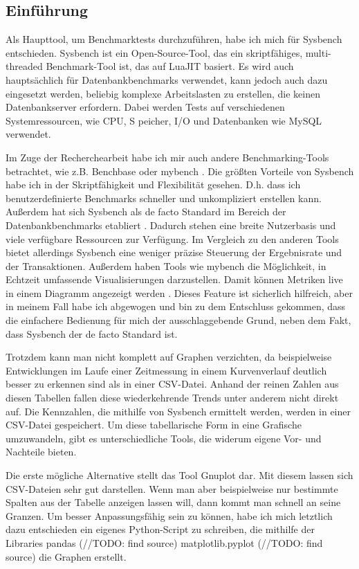 \subsection{Einführung}\label{subsec:einfuhrung}

Als Haupttool, um Benchmarktests durchzuführen, habe ich mich für Sysbench \cite{sysbench_repo}
entschieden. Sysbench ist ein Open-Source-Tool, das ein skriptfähiges, multi-threaded Benchmark-Tool
ist, das auf LuaJIT basiert. Es wird auch hauptsächlich für Datenbankbenchmarks verwendet, kann
jedoch auch dazu eingesetzt werden, beliebig komplexe Arbeitslasten zu erstellen, die keinen
Datenbankserver erfordern. Dabei werden Tests auf verschiedenen Systemressourcen, wie CPU, S
peicher, I/O und Datenbanken wie MySQL \cite{sysbench_mysql} verwendet.

Im Zuge der Recherchearbeit habe ich mir auch andere Benchmarking-Tools betrachtet, wie z.B.
Benchbase \cite{DifallahPCC13} oder mybench \cite{mybench_repo}. Die größten Vorteile von
Sysbench habe ich in der Skriptfähigkeit und Flexibilität gesehen. D.h. dass ich benutzerdefinierte
Benchmarks schneller und unkompliziert erstellen kann. Außerdem hat sich Sysbench als de facto
Standard im Bereich der Datenbankbenchmarks etabliert \cite{mybench_comparison}. Dadurch stehen
eine breite Nutzerbasis und viele verfügbare Ressourcen zur Verfügung. Im Vergleich zu den
anderen Tools bietet allerdings Sysbench eine weniger präzise Steuerung der Ergebnisrate
und der Transaktionen. Außerdem haben Tools wie mybench die Möglichkeit, in Echtzeit umfassende
Visualisierungen darzustellen. Damit können Metriken live in einem Diagramm angezeigt werden
\cite{mybench_user_interface}. Dieses Feature ist sicherlich hilfreich, aber in meinem Fall habe
ich abgewogen und bin zu dem Entschluss gekommen, dass die einfachere Bedienung für mich der
ausschlaggebende Grund, neben dem Fakt, dass Sysbench der de facto Standard ist.

Trotzdem kann man nicht komplett auf Graphen verzichten, da beispielweise Entwicklungen
im Laufe einer Zeitmessung in einem Kurvenverlauf deutlich besser zu erkennen sind als in einer CSV-Datei.
Anhand der reinen Zahlen aus diesen Tabellen fallen diese wiederkehrende Trends unter anderem nicht direkt auf.
Die Kennzahlen, die mithilfe von Sysbench ermittelt werden, werden in einer CSV-Datei gespeichert.
Um diese tabellarische Form in eine Grafische umzuwandeln, gibt es unterschiedliche Tools, die widerum
eigene Vor- und Nachteile bieten.

Die erste mögliche Alternative stellt das Tool Gnuplot \cite{gnuplot} dar.
Mit diesem lassen sich CSV-Dateien sehr gut darstellen. Wenn man aber beispielweise nur bestimmte Spalten
aus der Tabelle anzeigen lassen will, dann kommt man schnell an seine Granzen.
Um besser Anpassungsfähig sein zu können, habe ich mich letztlich dazu entschieden ein eigenes Python-Script
zu schreiben, die mithilfe der Libraries pandas (//TODO: find source) matplotlib.pyplot (//TODO: find source)
die Graphen erstellt.

